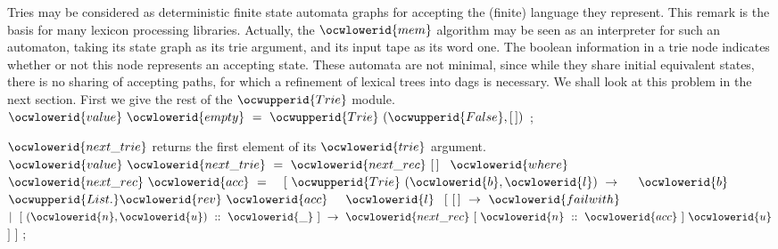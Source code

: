 \documentclass[12pt]{article}
\begin{document}
\ocwendcode{}\ocwindent{0.00em}
Tries may be considered as deterministic finite state automata graphs for 
   accepting the (finite) language they represent. This remark is the basis 
   for many lexicon processing libraries. Actually, the \ocwbegindcode{}$\ocwlowerid{mem}$\ocwenddcode{} algorithm may be
   seen as an interpreter for such an automaton, taking its state graph as its 
   trie argument, and its input tape as its word one. The boolean information 
   in a trie node indicates whether or not this node represents an accepting 
   state. These automata are not minimal, since while they share initial 
   equivalent states, there is no sharing of accepting paths, for which a 
   refinement of lexical trees into dags is necessary. We shall look at this 
   problem in the next section. First we give the rest of the \ocwbegindcode{}$\ocwupperid{Trie}$\ocwenddcode{} module. 
\ocweol
\label{../ML/trie.ml:4893}%
\medskip
\ocwbegincode{}\ocwindent{0.00em}
$\ocwlowerid{value}~\ocwlowerid{empty}~=~\ocwupperid{Trie}~(\ocwupperid{False},[\,])$\ocweol
\ocwindent{0.00em}
;\medskip

\ocwendcode{}\ocwindent{0.00em}
\ocwbegindcode{}$\ocwlowerid{next\_trie}$\ocwenddcode{} returns the first element of its \ocwbegindcode{}$\ocwlowerid{trie}$\ocwenddcode{} argument. 
\ocweol
\label{../ML/trie.ml:4994}%
\medskip
\ocwbegincode{}\ocwindent{0.00em}
$\ocwlowerid{value}~\ocwlowerid{next\_trie}~=~\ocwlowerid{next\_rec}~[\,]~$\ocweol
\ocwindent{1.00em}
$\ocwlowerid{where}~$~$\ocwlowerid{next\_rec}~\ocwlowerid{acc}~=~$~\ocweol
\ocwindent{2.00em}
$[~\ocwupperid{Trie}~(\ocwlowerid{b},\ocwlowerid{l})~\rightarrow{}~$\ocweol
\ocwindent{3.00em}
~$\ocwlowerid{b}~$~$\ocwupperid{List.}\ocwlowerid{rev}~\ocwlowerid{acc}$\ocweol
\ocwindent{3.00em}
~~$\ocwlowerid{l}~$\ocweol
\ocwindent{5.50em}
$[~[\,]~\rightarrow{}~\ocwlowerid{failwith}~$\ocweol
\ocwindent{5.50em}
$\mid{}~[~(\ocwlowerid{n},\ocwlowerid{u})~::~\ocwlowerid{\_}~]~\rightarrow{}~\ocwlowerid{next\_rec}~[~\ocwlowerid{n}~::~\ocwlowerid{acc}~]~\ocwlowerid{u}$\ocweol
\ocwindent{5.50em}
$]$\ocweol
\ocwindent{2.00em}
$]$\ocweol
\ocwindent{0.00em}
;\medskip
\end{document}
